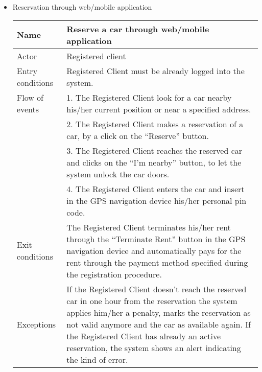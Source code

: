\begin{itemize}
\clearpage
\item Reservation through web/mobile application
\begin{table}[!h]
\begin{tabularx}{\linewidth}{l|X}
\centering
Name & Reserve a car through web/mobile application \\ \hline
Actor & Registered client \\ \hline
Entry conditions & Registered Client must be already logged into the system. \\ \hline
Flow of events & 1. The Registered Client look for a car nearby his/her current position or near a specified address. \\
& 2. The Registered Client makes a reservation of a car, by a click on the “Reserve” button.\\
& 3. The Registered Client reaches the reserved car and clicks on the “I’m nearby” button, to let the system unlock the car doors. \\
& 4. The Registered Client enters the car and insert in the GPS navigation device his/her personal pin code. \\ \hline
Exit conditions & The Registered Client terminates his/her rent through the “Terminate Rent” button in the GPS navigation device and automatically pays for the rent through the payment method specified during the registration procedure. \\ \hline
Exceptions & If the Registered Client doesn’t reach the reserved car in one hour from the reservation the system applies him/her a penalty, marks the reservation as not valid anymore and the car as available again. If the Registered Client has already an active reservation, the system shows an alert indicating the kind of error. \\
\end{tabularx}
\end{table}


\end{itemize}
